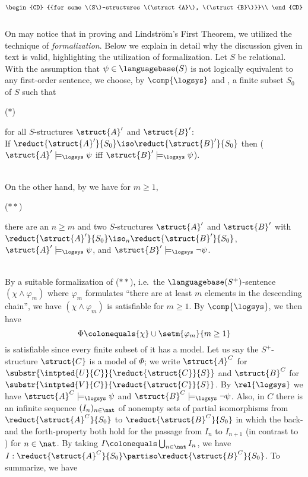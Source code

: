 \begin{enumerate}[1.]
\[\begin{CD}
{{for some \(S\)-structures \(\struct{A}\), \(\struct{B}\)}}\\
\end{CD}
\]\bigskip\\
On may notice that in proving  and Lindstr\"{o}m's First Theorem, we utilized the technique of \emph{formalization}. Below we explain in detail why the discussion given in text is valid, highlighting the utilization of formalization. Let $S$ be relational.\bigskip\\
With the assumption that $\psi \in \languagebase(S)$ is not logically equivalent to any first-order sentence, we choose, by $\comp{\logsys}$ and , a finite subset $S_0$ of $S$ such that\smallskip\\
\begin{quoteno}{($\ast$)}
\begin{minipage}{64ex}
for all $S$-structures $\struct{A}^\prime$ and $\struct{B}^\prime$:\\If $\reduct{\struct{A}^\prime}{S_0} \iso \reduct{\struct{B}^\prime}{S_0}$ then ($\struct{A}^\prime \models_\logsys \psi$ \quad iff \quad $\struct{B}^\prime \models_\logsys \psi$).
\end{minipage}
\end{quoteno}\smallskip\\
On the other hand, by  we have for $m \geq 1$,\smallskip\\
\begin{quoteno}{($\ast\ast$)}
\begin{minipage}{64ex}
there are an $n \geq m$ and two $S$-structures $\struct{A}^\prime$ and $\struct{B}^\prime$ with\smallskip\\$\reduct{\struct{A}^\prime}{S_0} \iso_n \reduct{\struct{B}^\prime}{S_0}$, $\struct{A}^\prime \models_\logsys \psi$, and $\struct{B}^\prime \models_\logsys \neg\psi$.
\end{minipage}
\end{quoteno}\bigskip\\
By a suitable formalization of ($\ast\ast$), i.e.\ the $\languagebase(S^+)$-sentence $(\chi \land \varphi_m)$ where $\varphi_m$ formulates ``there are at least $m$ elements in the descending chain'', we have $(\chi \land \varphi_m)$ is satisfiable for $m \geq 1$. By $\comp{\logsys}$, we then have
\[
\Phi \colonequals \{ \chi \} \cup \setm{\varphi_m}{m \geq 1}
\]
is satisfiable since every finite subset of it has a model. Let us say the $S^+$-structure $\struct{C}$ is a model of $\Phi$; we write $\struct{A}^C$ for $\substr{\intpted{U}{C}}{\reduct{\struct{C}}{S}}$ and $\struct{B}^C$ for $\substr{\intpted{V}{C}}{\reduct{\struct{C}}{S}}$. By $\rel{\logsys}$ we have $\struct{A}^C \models_\logsys \psi$ and $\struct{B}^C \models_\logsys \neg\psi$. Also, in $C$ there is an infinite sequence $(I_n)_{n \in \nat}$ of nonempty sets of partial isomorphisms from $\reduct{\struct{A}^C}{S_0}$ to $\reduct{\struct{B}^C}{S_0}$ in which the back- and the forth-property both hold for the passage from $I_n$ to $I_{n + 1}$ (in contrast to ) for $n \in \nat$. By taking $I \colonequals \bigcup_{n \in \nat} I_n$, we have $I: \reduct{\struct{A}^C}{S_0} \partiso \reduct{\struct{B}^C}{S_0}$. To summarize, we have

\end{enumerate}
